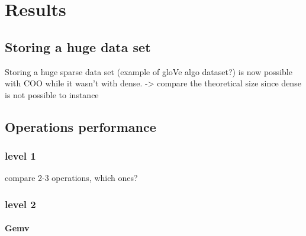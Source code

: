 \chapter{Results}

\section{Storing a huge data set}
Storing a huge sparse data set (example of gloVe algo dataset?) is now possible with COO while it wasn't with dense. 
-> compare the theoretical size since dense is not possible to instance

\section{Operations performance}

\subsection{level 1}
compare 2-3 operations, which ones?
\subsection{level 2}
\subsubsection{Gemv}